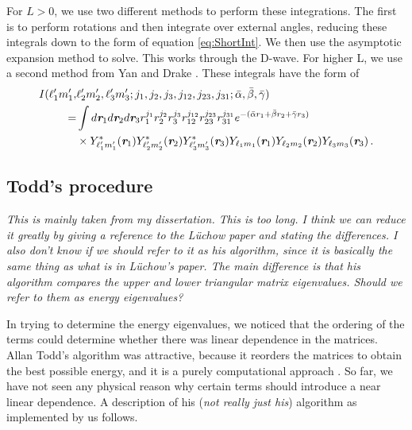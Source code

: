 \documentclass[preprint,showpacs,preprintnumbers,amsmath,amssymb]{revtex4}
\begin{document}
For $L > 0$, we use two different methods to perform these integrations. The first is to perform rotations and then integrate over external angles, reducing these integrals down to the form of equation \ref{eq:ShortInt}. We then use the asymptotic expansion method to solve. This works through the D-wave. For higher L, we use a second method from Yan and Drake \cite{Yan1997}. These integrals have the form of
\begin{align}
\label{eq:ShortIntGen}
\nonumber I(\ell_1^\prime m_1^\prime, & \ell_2^\prime m_2^\prime, \ell_3^\prime m_3^\prime; j_1,j_2,j_3,j_{12},j_{23},j_{31}; \bar{\alpha}, \bar{\beta}, \bar{\gamma}) \\
\nonumber = & \int
d \textit{\textbf{r}}_1 d \textit{\textbf{r}}_2 d \textit{\textbf{r}}_3
r_1^{j_1} r_2^{j_2} r_3^{j_3} r_{12}^{j_{12}}
r_{23}^{j_{23}} r_{31}^{j_{31}}
e^{-(\bar{\alpha} r_1 + \bar{\beta} r_2 + \bar{\gamma} r_3)} \\
& \times Y_{\ell_1^\prime m_1^\prime}^* (\textit{\textbf{r}}_1) Y_{\ell_2^\prime m_2^\prime}^* (\textit{\textbf{r}}_2) Y_{\ell_3^\prime m_3^\prime}^* (\textit{\textbf{r}}_3)
Y_{\ell_1 m_1} (\textit{\textbf{r}}_1) Y_{\ell_2 m_2} (\textit{\textbf{r}}_2) Y_{\ell_3 m_3} (\textit{\textbf{r}}_3)\, .
\end{align}


\subsection{Todd's procedure}
\emph{This is mainly taken from my dissertation. This is too long. I think we can reduce it greatly by giving a reference to the L\"uchow paper and stating the differences. I also don't know if we should refer to it as his algorithm, since it is basically the same thing as what is in L\"uchow's paper. The main difference is that his algorithm compares the upper and lower triangular matrix eigenvalues. Should we refer to them as energy eigenvalues?}

In trying to determine the energy eigenvalues, we noticed that the ordering of the terms could determine whether there was linear dependence in the matrices.  Allan Todd's algorithm was attractive, because it reorders the matrices to obtain the best possible energy, and it is a purely computational approach \cite{Todd2007}. So far, we have not seen any physical reason why certain terms should introduce a near linear dependence.  A description of his (\emph{not really just his}) algorithm as implemented by us follows.
\end{document}
